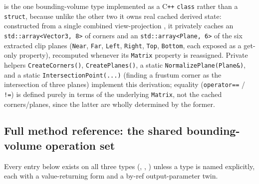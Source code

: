  is the one bounding-volume type implemented as a C\texttt{++}
\texttt{class} rather than a \texttt{struct}, because unlike the other two it owns real
cached derived state: constructed from a single combined view-projection ,
it privately caches an \texttt{std::array<Vector3, 8>} of corners and an
\texttt{std::array<Plane, 6>} of the six extracted clip planes (\texttt{Near}, \texttt{Far},
\texttt{Left}, \texttt{Right}, \texttt{Top}, \texttt{Bottom}, each exposed as a get-only
 property), recomputed whenever its \texttt{Matrix} property is reassigned.
Private helpers \texttt{CreateCorners()}, \texttt{CreatePlanes()}, a static
\texttt{NormalizePlane(Plane\&)}, and a static \texttt{IntersectionPoint(...)} (finding a
frustum corner as the intersection of three planes) implement this derivation; equality
(\texttt{operator==} / \texttt{!=}) is defined purely in terms of the underlying \texttt{Matrix},
not the cached corners/planes, since the latter are wholly determined by the former.

\subsection{Full method reference: the shared bounding-volume operation set}
\label{sec:bounding-volumes-full-reference}

Every entry below exists on all three types (, ,
) unless a type is named explicitly, each with a value-returning form
and a by-ref output-parameter twin.

